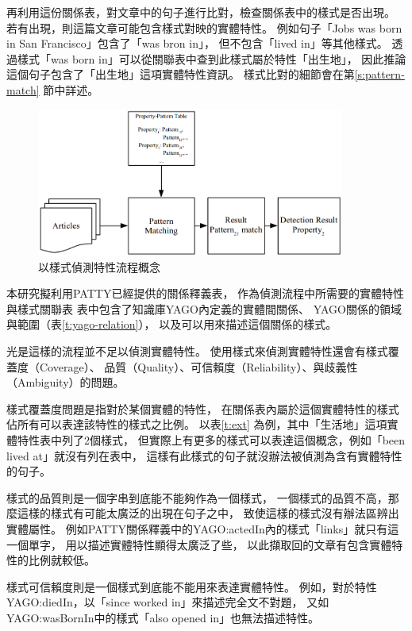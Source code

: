 再利用這份關係表，對文章中的句子進行比對，檢查關係表中的樣式是否出現。
若有出現，則這篇文章可能包含樣式對映的實體特性。
例如句子「Jobs was born in San Francisco」包含了「was bron in」，
但不包含「lived in」等其他樣式。
透過樣式「was born in」可以從關聯表中查到此樣式屬於特性「出生地」，
因此推論這個句子包含了「出生地」這項實體特性資訊。
樣式比對的細節會在第\ref{s:pattern-match} 節中詳述。

\begin{figure}
    \centering
    \includegraphics[width=0.9\textwidth]{images/03-process-v1}
    \caption{以樣式偵測特性流程概念}
    \label{i:process-v1}
\end{figure}

本研究擬利用PATTY已經提供的關係釋義表，
作為偵測流程中所需要的實體特性與樣式關聯表
表中包含了知識庫YAGO內定義的實體間關係、
YAGO關係的領域與範圍（表\ref{t:yago-relation}），
以及可以用來描述這個關係的樣式。



光是這樣的流程並不足以偵測實體特性。
使用樣式來偵測實體特性還會有樣式覆蓋度（Coverage）、
品質（Quality）、可信賴度（Reliability）、與歧義性（Ambiguity）的問題。

樣式覆蓋度問題是指對於某個實體的特性，
在關係表內屬於這個實體特性的樣式佔所有可以表達該特性的樣式之比例。
以表\ref{t:ext} 為例，其中「生活地」這項實體特性表中列了2個樣式，
但實際上有更多的樣式可以表達這個概念，例如「been lived at」就沒有列在表中，
這樣有此樣式的句子就沒辦法被偵測為含有實體特性的句子。

樣式的品質則是一個字串到底能不能夠作為一個樣式，    %
一個樣式的品質不高，那麼這樣的樣式有可能太廣泛的出現在句子之中，
致使這樣的樣式沒有辦法區辨出實體屬性。
例如PATTY關係釋義中的YAGO:actedIn內的樣式「links」就只有這一個單字，
用以描述實體特性顯得太廣泛了些，
以此擷取回的文章有包含實體特性的比例就較低。

樣式可信賴度則是一個樣式到底能不能用來表達實體特性。
例如，對於特性YAGO:diedIn，以「since worked in」來描述完全文不對題，
又如YAGO:wasBornIn中的樣式「also opened in」也無法描述特性。

